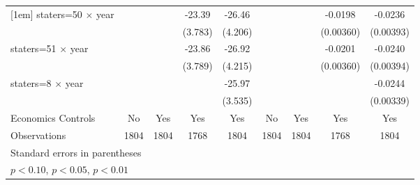 {\begin{longtable}{l*{8}{c}}
[1em]
staters=50 $\times$ year&                     &                     &      -23.39\sym{***}&      -26.46\sym{***}&                     &                     &     -0.0198\sym{***}&     -0.0236\sym{***}\\
                    &                     &                     &     (3.783)         &     (4.206)         &                     &                     &   (0.00360)         &   (0.00393)         \\
[1em]
staters=51 $\times$ year&                     &                     &      -23.86\sym{***}&      -26.92\sym{***}&                     &                     &     -0.0201\sym{***}&     -0.0240\sym{***}\\
                    &                     &                     &     (3.789)         &     (4.215)         &                     &                     &   (0.00360)         &   (0.00394)         \\
[1em]
staters=8 $\times$ year&                     &                     &                     &      -25.97\sym{***}&                     &                     &                     &     -0.0244\sym{***}\\
                    &                     &                     &                     &     (3.535)         &                     &                     &                     &   (0.00339)         \\
[1em]
Economics Controls  &          No         &         Yes         &         Yes         &         Yes         &          No         &         Yes         &         Yes         &         Yes         \\
\hline
Observations        &        1804         &        1804         &        1768         &        1804         &        1804         &        1804         &        1768         &        1804         \\
\hline\hline
\multicolumn{9}{l}{\footnotesize Standard errors in parentheses}\\
\multicolumn{9}{l}{\footnotesize \sym{*} \(p<0.10\), \sym{**} \(p<0.05\), \sym{***} \(p<0.01\)}\\
\end{longtable}
}
